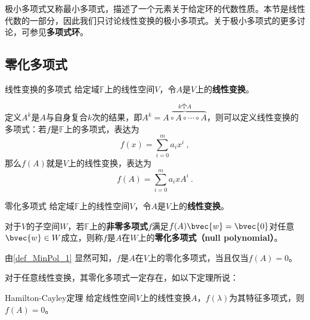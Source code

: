 



极小多项式又称最小多项式，描述了一个元素关于给定环的代数性质。本节是线性代数的一部分，因此我们只讨论线性变换的极小多项式。关于极小多项式的更多讨论，可参见\textbf{多项式环}。


\subsection{零化多项式}





\begin{definition}{线性变换的多项式}
给定域$\mathbb{F}$上的线性空间$V$，令$A$是$V$上的\textbf{线性变换}。

定义$A^k$是$A$与自身复合$k$次的结果，即$A^k=\overbrace{A\circ A\circ\cdots\circ A}^{k\text{个}A}$，则可以定义线性变换的多项式：若$f$是$\mathbb{F}$上的多项式，表达为
\begin{equation}
f(x) = \sum_{i=0}^m a_ix^i~, 
\end{equation}
那么$f(A)$就是$V$上的线性变换，表达为
\begin{equation}
f(A) = \sum_{i=0}^m a_ixA^i~. 
\end{equation}
\end{definition}



\begin{definition}{零化多项式}\label{def_MinPol_1}
给定域$\mathbb{F}$上的线性空间$V$，令$A$是$V$上的\textbf{线性变换}。

对于$V$的子空间$W$，若$\mathbb{F}$上的\textbf{非零多项式}$f$满足$f(A)\bvec{w}=\bvec{0}$对任意$\bvec{w}\in W$成立，则称$f$是$A$在$W$上的\textbf{零化多项式（null polynomial）}。
\end{definition}


由\autoref{def_MinPol_1} 显然可知，$f$是$A$在$V$上的零化多项式，当且仅当$f(A)=0$。


对于任意线性变换，其零化多项式一定存在，如以下定理所说：

\begin{theorem}{Hamilton-Cayley定理}\label{the_MinPol_1}
给定线性空间$V$上的线性变换$A$，$f(\lambda)$为其特征多项式，则$f(A)=0$。
\end{theorem}

